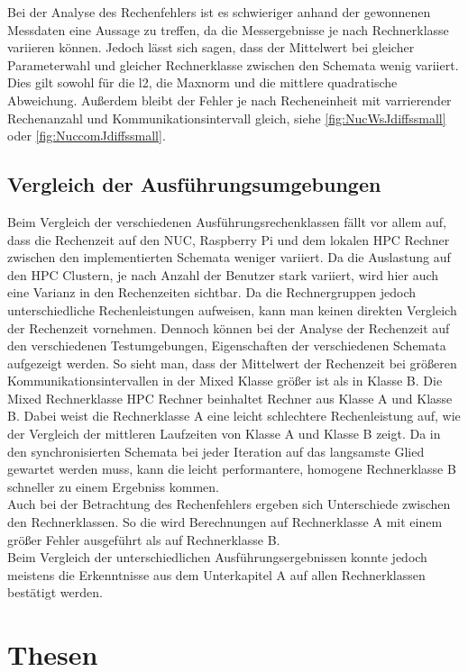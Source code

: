 Bei der Analyse des Rechenfehlers ist es schwieriger anhand der gewonnenen Messdaten eine Aussage zu treffen, da die Messergebnisse je nach Rechnerklasse variieren können. Jedoch lässt sich sagen, dass der Mittelwert bei gleicher Parameterwahl und gleicher Rechnerklasse zwischen den Schemata wenig variiert. Dies gilt sowohl für die l2, die Maxnorm und die mittlere quadratische Abweichung. Außerdem bleibt der Fehler je nach Recheneinheit mit varrierender Rechenanzahl und Kommunikationsintervall gleich, siehe \autoref{fig:NucWsJdiffssmall} oder \autoref{fig:NuccomJdiffssmall}.\\

\subsection{Vergleich der Ausführungsumgebungen}
Beim Vergleich der verschiedenen Ausführungsrechenklassen fällt vor allem auf, dass die Rechenzeit auf den NUC, Raspberry Pi und dem lokalen HPC Rechner zwischen den implementierten Schemata weniger variiert. Da die Auslastung auf den HPC Clustern, je nach Anzahl der Benutzer stark variiert, wird hier auch eine Varianz in den Rechenzeiten sichtbar. Da die Rechnergruppen jedoch unterschiedliche Rechenleistungen aufweisen, kann man keinen direkten Vergleich der Rechenzeit vornehmen. Dennoch können bei der Analyse der Rechenzeit auf den verschiedenen Testumgebungen, Eigenschaften der verschiedenen Schemata aufgezeigt werden. So sieht man, dass der Mittelwert der Rechenzeit bei größeren Kommunikationsintervallen in der Mixed Klasse größer ist als in Klasse B. Die Mixed Rechnerklasse HPC Rechner beinhaltet Rechner aus Klasse A und Klasse B. Dabei weist die Rechnerklasse A eine leicht schlechtere Rechenleistung auf, wie der Vergleich der mittleren Laufzeiten von Klasse A und Klasse B zeigt. Da in den synchronisierten Schemata bei jeder Iteration auf das langsamste Glied gewartet werden muss, kann die leicht performantere, homogene Rechnerklasse B schneller zu einem Ergebniss kommen.\\
Auch bei der Betrachtung des Rechenfehlers ergeben sich Unterschiede zwischen den Rechnerklassen. So die wird Berechnungen auf Rechnerklasse A mit einem größer Fehler ausgeführt als auf Rechnerklasse B. \\
Beim Vergleich der unterschiedlichen Ausführungsergebnissen konnte jedoch meistens die Erkenntnisse aus dem Unterkapitel A auf allen Rechnerklassen bestätigt werden.


\section{Thesen}
\label{sec:thesen}

